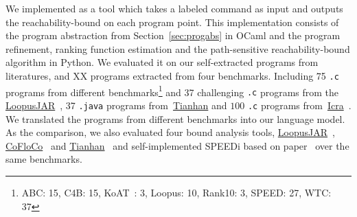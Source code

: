 We implemented {\THESYSTEM} as a tool which takes a labeled command as input  
and outputs the reachability-bound on each program point.
This implementation consists of the 
program abstraction from Section~\ref{sec:progabs} in OCaml and the program refinement, ranking function estimation and the path-sensitive reachability-bound algorithm in Python.
We evaluated it on our self-extracted programs from literatures, and XX programs extracted from four benchmarks. 
Including 75 {\tt .c} programs from different benchmarks\footnote{ABC: 15, C4B: 15, KoAT~\cite{BrockschmidtEFFG14,FalkeKS12,FalkeKS11}: 3, Loopus: 10, Rank10: 3, SPEED: 27, WTC: 37} and 37 challenging {\tt .c} programs 
from the \hyperlink{https://forsyte.at/static/people/sinn/loopusJAR/index.html}{LoopusJAR}~\cite{SinnZV17},
37 {\tt .java} programs from~\hyperlink{https://zenodo.org/record/5140586\#.Y5pBoC-B1QI}{Tianhan}\cite{LuCT21}
and $100$ {\tt .c} programs from~\hyperlink{https://github.com/icra-team/icra}{Icra}~\cite{KincaidBCR19,CyphertBKR19}.
We translated the programs from different benchmarks into our language model.
As the comparison, we also evaluated four bound analysis tools, 
\hyperlink{https://forsyte.at/software/loopus/}{LoopusJAR}~\cite{SinnZV17},
\hyperlink{https://github.com/aeflores/CoFloCo/tree/master/src}{CoFloCo}~\cite{Montoya17,Flores-Montoya16,Flores-MontoyaH14}
and \hyperlink{https://zenodo.org/record/5140586\#.Y5pBoC-B1QI}{Tianhan}~\cite{LuCT21}
and self-implemented SPEEDi based on paper~\cite{GulwaniJK09}
over the same benchmarks.

